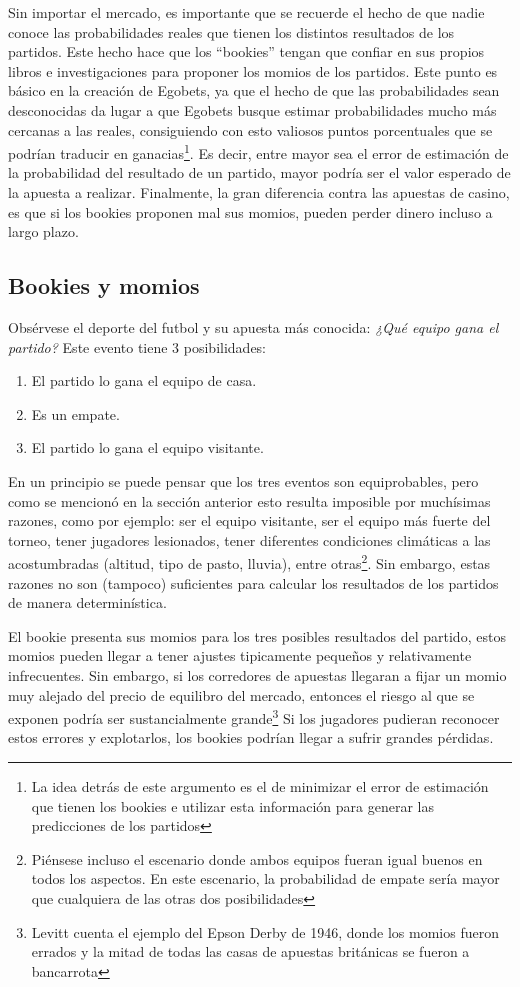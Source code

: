 Sin importar el mercado, es importante que se recuerde el hecho de que nadie conoce las probabilidades reales que tienen los distintos resultados de los partidos. Este hecho hace que los ``bookies'' tengan que confiar en sus propios libros e investigaciones para proponer los momios de los partidos. Este punto es básico en la creación de Egobets, ya que el hecho de que las probabilidades sean desconocidas da lugar a que Egobets busque estimar probabilidades mucho más cercanas a las reales, consiguiendo con esto valiosos puntos porcentuales que se podrían traducir en ganacias\footnote{La idea detrás de este argumento es el de minimizar el error de estimación que tienen los bookies e utilizar esta información para generar las predicciones de los partidos}. Es decir, entre mayor sea el error de estimación de la probabilidad del resultado de un partido, mayor podría ser el valor esperado de la apuesta a realizar. Finalmente, la gran diferencia contra las apuestas de casino, es que si los bookies proponen mal sus momios, pueden perder dinero incluso a largo plazo.



\subsection{Bookies y momios}
Obsérvese el deporte del futbol y su apuesta más conocida: \emph{¿Qué equipo gana el partido?}
Este evento tiene $3$ posibilidades:
\begin{enumerate}
	\item El partido lo gana el equipo de casa.
	\item Es un empate.
	\item El partido lo gana el equipo visitante.
\end{enumerate}
En un principio se puede pensar que los tres eventos son equiprobables, pero como se mencionó en la sección anterior esto resulta imposible por muchísimas razones, como por ejemplo: ser el equipo visitante, ser el equipo más fuerte del torneo, tener jugadores lesionados, tener diferentes condiciones climáticas a las acostumbradas (altitud, tipo de pasto, lluvia), entre otras\footnote{Piénsese incluso el escenario donde ambos equipos fueran igual buenos en todos los aspectos. En este escenario, la probabilidad de empate sería mayor que cualquiera de las otras dos posibilidades}. Sin embargo, estas razones no son (tampoco) suficientes para calcular los resultados de los partidos de manera determinística.


El bookie presenta sus momios para los tres posibles resultados del partido, estos momios pueden llegar a tener ajustes tipicamente pequeños y relativamente infrecuentes. Sin embargo, si los corredores de apuestas llegaran a fijar un momio muy alejado del precio de equilibro del mercado, entonces el riesgo al que se exponen podría ser sustancialmente grande\footnote{Levitt \cite{levitt2004gambling} cuenta el ejemplo del Epson Derby de 1946, donde los momios fueron errados y la mitad de todas las casas de apuestas británicas se fueron a bancarrota} Si los jugadores pudieran reconocer estos errores y explotarlos, los bookies podrían llegar a sufrir grandes pérdidas.



